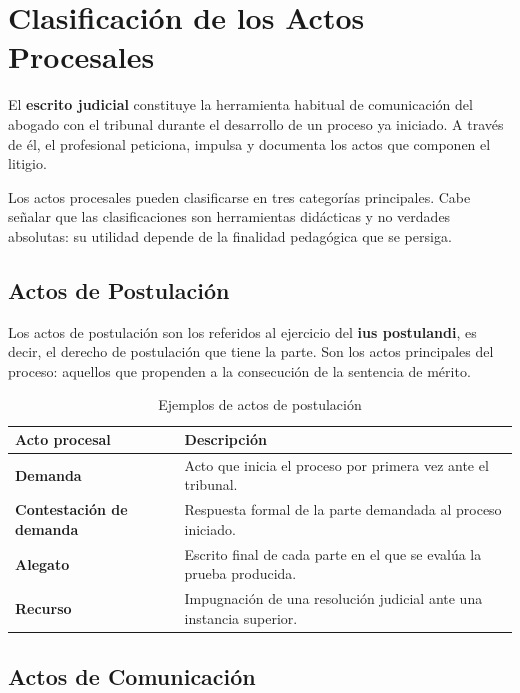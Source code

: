 \documentclass[12pt,oneside]{book}
\begin{document}
\chapter{Clasificación de los Actos Procesales}

El \textbf{escrito judicial} constituye la herramienta habitual de comunicación del abogado con el tribunal durante el desarrollo de un proceso ya iniciado. A través de él, el profesional peticiona, impulsa y documenta los actos que componen el litigio.

Los actos procesales pueden clasificarse en tres categorías principales. Cabe señalar que las clasificaciones son herramientas didácticas y no verdades absolutas: su utilidad depende de la finalidad pedagógica que se persiga.

\section{Actos de Postulación}

Los actos de postulación son los referidos al ejercicio del \textbf{ius postulandi}, es decir, el derecho de postulación que tiene la parte. Son los actos principales del proceso: aquellos que propenden a la consecución de la sentencia de mérito.

\begin{table}[H]
\centering
\caption{Ejemplos de actos de postulación}
\begin{tabularx}{\textwidth}{>{\bfseries}lX}
\toprule
Acto procesal & Descripción \\
\midrule
Demanda & Acto que inicia el proceso por primera vez ante el tribunal. \\
Contestación de demanda & Respuesta formal de la parte demandada al proceso iniciado. \\
Alegato & Escrito final de cada parte en el que se evalúa la prueba producida. \\
Recurso & Impugnación de una resolución judicial ante una instancia superior. \\
\bottomrule
\end{tabularx}
\end{table}

\section{Actos de Comunicación}
\end{document}
